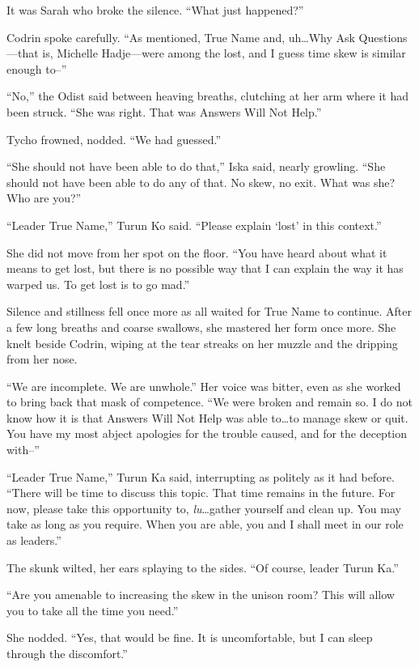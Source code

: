 It was Sarah who broke the silence. ``What just happened?''

Codrin spoke carefully. ``As mentioned, True Name and, uh\ldots Why Ask Questions—that is, Michelle Hadje—were among the lost, and I guess time skew is similar enough to--''

``No,'' the Odist said between heaving breaths, clutching at her arm where it had been struck. ``She was right. That was Answers Will Not Help.''

Tycho frowned, nodded. ``We had guessed.''

``She should not have been able to do that,'' Iska said, nearly growling. ``She should not have been able to do any of that. No skew, no exit. What was she? Who are you?''

``Leader True Name,'' Turun Ko said. ``Please explain `lost' in this context.''

She did not move from her spot on the floor. ``You have heard about what it means to get lost, but there is no possible way that I can explain the way it has warped us. To get lost is to go mad.''

Silence and stillness fell once more as all waited for True Name to continue. After a few long breaths and coarse swallows, she mastered her form once more. She knelt beside Codrin, wiping at the tear streaks on her muzzle and the dripping from her nose.

``We are incomplete. We are unwhole.'' Her voice was bitter, even as she worked to bring back that mask of competence. ``We were broken and remain so. I do not know how it is that Answers Will Not Help was able to\ldots to manage skew or quit. You have my most abject apologies for the trouble caused, and for the deception with--''

``Leader True Name,'' Turun Ka said, interrupting as politely as it had before. ``There will be time to discuss this topic. That time remains in the future. For now, please take this opportunity to, \emph{lu}\ldots gather yourself and clean up. You may take as long as you require. When you are able, you and I shall meet in our role as leaders.''

The skunk wilted, her ears splaying to the sides. ``Of course, leader Turun Ka.''

``Are you amenable to increasing the skew in the unison room? This will allow you to take all the time you need.''

She nodded. ``Yes, that would be fine. It is uncomfortable, but I can sleep through the discomfort.''

